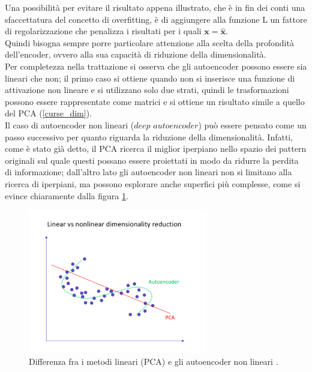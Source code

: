 Una possibilità per evitare il risultato appena illustrato, che è in fin dei conti una sfaccettatura del concetto di overfitting, è di aggiungere alla funzione L un fattore di regolarizzazione che penalizza i risultati per i quali $\textbf{x} = \hat{\textbf{x}}$. \\
Quindi bisogna sempre porre particolare attenzione alla scelta della profondità dell'encoder, ovvero alla sua capacità di riduzione della dimensionalità. \\
Per completezza nella trattazione si osserva che gli autoencoder possono essere sia lineari che non; il primo caso si ottiene quando non si inserisce una funzione di attivazione non lineare e si utilizzano solo due strati, quindi le trasformazioni possono essere rappresentate come matrici e si ottiene un risultato simile a quello del PCA (\ref{curse_dim}). \\
Il caso di autoencoder non lineari ($\textit{deep autoencoder}$) può essere pensato come un passo successivo per quanto riguarda la riduzione della dimensionalità. Infatti, come è stato già detto, il PCA ricerca il miglior iperpiano nello spazio dei pattern originali sul quale questi possano essere proiettati in modo da ridurre la perdita di informazione; dall'altro lato gli autoencoder non lineari non si limitano alla ricerca di iperpiani, ma possono esplorare anche superfici più complesse, come si evince chiaramente dalla figura \ref{autoencoder_non_lineari}.

\begin{figure}[h!]
	\centering
	\includegraphics[width=0.70\textwidth]{figs/Autoencoder_non_lineari.png}
	\caption{Differenza fra i metodi lineari (PCA) e gli autoencoder non lineari \cite{Autoencoders}.}
	\label{autoencoder_non_lineari}
\end{figure}


